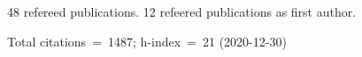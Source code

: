 48 refereed publications. 12 refeered publications as first author.

Total citations~=~1487; h-index~=~21 (2020-12-30)